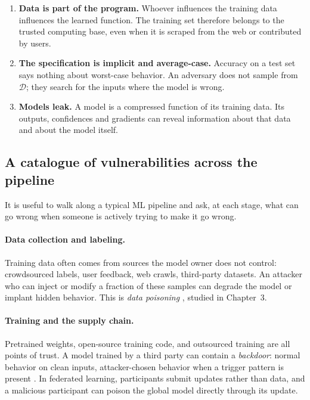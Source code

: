 \documentclass[10pt,a4paper]{extarticle}
\theoremstyle{definition}
\newcommand{\D}{\mathcal{D}}
\begin{document}
\begin{enumerate}
  \item \textbf{Data is part of the program.} Whoever influences the training data influences the learned function. The training set therefore belongs to the trusted computing base, even when it is scraped from the web or contributed by users.
  \item \textbf{The specification is implicit and average-case.} Accuracy on a test set says nothing about worst-case behavior. An adversary does not sample from \(\D\); they search for the inputs where the model is wrong.
  \item \textbf{Models leak.} A model is a compressed function of its training data. Its outputs, confidences and gradients can reveal information about that data and about the model itself.
\end{enumerate}

\subsection{A catalogue of vulnerabilities across the pipeline}

It is useful to walk along a typical ML pipeline and ask, at each stage, what can go wrong when someone is actively trying to make it go wrong.

\paragraph{Data collection and labeling.} Training data often comes from sources the model owner does not control: crowdsourced labels, user feedback, web crawls, third-party datasets. An attacker who can inject or modify a fraction of these samples can degrade the model or implant hidden behavior. This is \emph{data poisoning} \citep{biggio2012poisoning}, studied in Chapter~3.

\paragraph{Training and the supply chain.} Pretrained weights, open-source training code, and outsourced training are all points of trust. A model trained by a third party can contain a \emph{backdoor}: normal behavior on clean inputs, attacker-chosen behavior when a trigger pattern is present \citep{gu2019badnets}. In federated learning, participants submit updates rather than data, and a malicious participant can poison the global model directly through its update.
\end{document}
